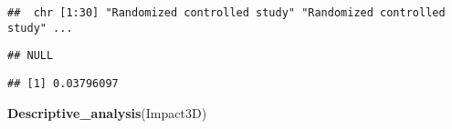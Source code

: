 \documentclass[]{article}
\newenvironment{Shaded}{\begin{snugshade}}{\end{snugshade}}
\newcommand{\DataTypeTok}[1]{\textcolor[rgb]{0.13,0.29,0.53}{#1}}
\newcommand{\KeywordTok}[1]{\textcolor[rgb]{0.13,0.29,0.53}{\textbf{#1}}}
\newcommand{\NormalTok}[1]{#1}
\newcommand{\OperatorTok}[1]{\textcolor[rgb]{0.81,0.36,0.00}{\textbf{#1}}}
\newcommand{\StringTok}[1]{\textcolor[rgb]{0.31,0.60,0.02}{#1}}
\begin{document}
\begin{verbatim}
##  chr [1:30] "Randomized controlled study" "Randomized controlled study" ...
\end{verbatim}

\begin{verbatim}
## NULL
\end{verbatim}

\begin{Shaded}
\end{Shaded}

\begin{verbatim}
## [1] 0.03796097
\end{verbatim}

\begin{Shaded}
\begin{Highlighting}[]
\KeywordTok{Descriptive_analysis}\NormalTok{(Impact3D)}
\end{Highlighting}
\end{Shaded}
\end{document}
